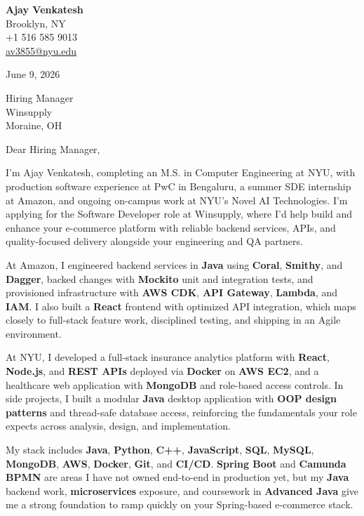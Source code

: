 \documentclass[letterpaper,11pt]{article}
\begin{document}
\begin{flushleft}
\textbf{\large Ajay Venkatesh} \\
Brooklyn, NY \\
+1 516 585 9013 \\
\href{mailto:av3855@nyu.edu}{av3855@nyu.edu}
\end{flushleft}
\vspace{10pt}
June 9, 2026
\vspace{6pt}

Hiring Manager \\
Winsupply \\
Moraine, OH

\vspace{10pt}

Dear Hiring Manager,

I'm Ajay Venkatesh, completing an M.S. in Computer Engineering at NYU, with production software experience at PwC in Bengaluru, a summer SDE internship at Amazon, and ongoing on-campus work at NYU's Novel AI Technologies. I'm applying for the Software Developer role at Winsupply, where I'd help build and enhance your e-commerce platform with reliable backend services, APIs, and quality-focused delivery alongside your engineering and QA partners.

At Amazon, I engineered backend services in \textbf{Java} using \textbf{Coral}, \textbf{Smithy}, and \textbf{Dagger}, backed changes with \textbf{Mockito} unit and integration tests, and provisioned infrastructure with \textbf{AWS CDK}, \textbf{API Gateway}, \textbf{Lambda}, and \textbf{IAM}. I also built a \textbf{React} frontend with optimized API integration, which maps closely to full-stack feature work, disciplined testing, and shipping in an Agile environment.

At NYU, I developed a full-stack insurance analytics platform with \textbf{React}, \textbf{Node.js}, and \textbf{REST APIs} deployed via \textbf{Docker} on \textbf{AWS EC2}, and a healthcare web application with \textbf{MongoDB} and role-based access controls. In side projects, I built a modular \textbf{Java} desktop application with \textbf{OOP design patterns} and thread-safe database access, reinforcing the fundamentals your role expects across analysis, design, and implementation.

My stack includes \textbf{Java}, \textbf{Python}, \textbf{C++}, \textbf{JavaScript}, \textbf{SQL}, \textbf{MySQL}, \textbf{MongoDB}, \textbf{AWS}, \textbf{Docker}, \textbf{Git}, and \textbf{CI/CD}. \textbf{Spring Boot} and \textbf{Camunda BPMN} are areas I have not owned end-to-end in production yet, but my \textbf{Java} backend work, \textbf{microservices} exposure, and coursework in \textbf{Advanced Java} give me a strong foundation to ramp quickly on your Spring-based e-commerce stack.
\end{document}

